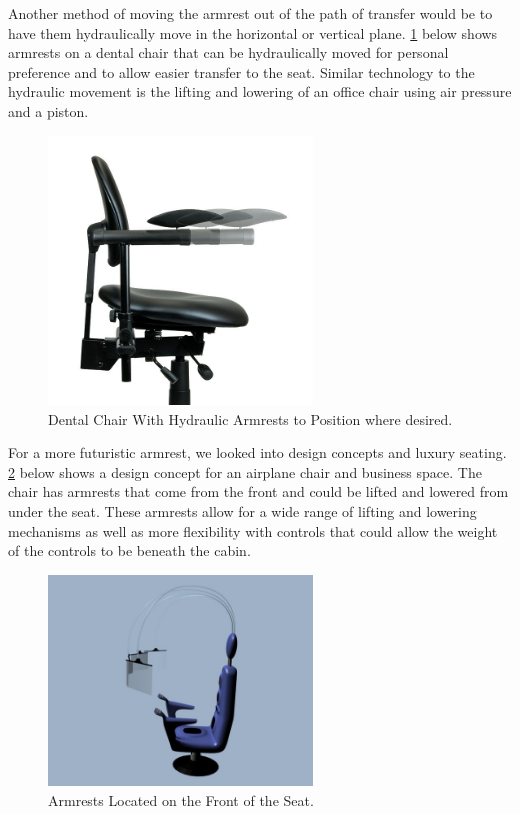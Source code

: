 Another method of moving the armrest out of the path of transfer would be to have them hydraulically move in the horizontal or vertical plane. \ref{fig:dentalchairarmrest.jpg} below shows armrests on a dental chair that can be hydraulically moved for personal preference and to allow easier transfer to the seat. Similar technology to the hydraulic movement is the lifting and lowering of an office chair using air pressure and a piston.   



\begin{figure}[h]
  \centering
     \includegraphics[width=7cm]{images/dentalchairarmrest.jpg}
   \caption{Dental Chair With Hydraulic Armrests to Position where desired. \cite{dental}}
  \label{fig:dentalchairarmrest.jpg}
\end{figure}

For a more futuristic armrest, we looked into design concepts and luxury seating.  \ref{fig:FrontArmrests.jpg} below shows a design concept for an airplane chair and business space.  The chair has armrests that come from the front and could be lifted and lowered from under the seat.  These armrests allow for a wide range of lifting and lowering mechanisms as well as more flexibility with controls that could allow the weight of the controls to be beneath the cabin.


\begin{figure}[h]
  \centering
     \includegraphics[width=7cm]{images/FrontArmrest.jpg}
   \caption{Armrests Located on the Front of the Seat. \cite{frontarmrests}}
  \label{fig:FrontArmrests.jpg}
\end{figure}

